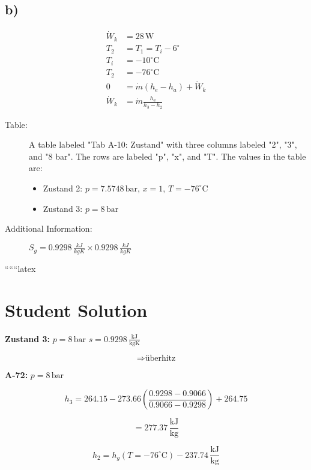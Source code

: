 

\subsection*{b)}

\begin{align*}
    \dot{W}_k &= 28 \, \text{W} \\
    T_2 &= T_1 = T_i - 6^\circ \\
    T_i &= -10^\circ \text{C} \\
    T_2 &= \boxed{-76^\circ \text{C}} \\
    0 &= \dot{m} (h_e - h_a) + \dot{W}_k \\
    \dot{W}_k &= \dot{m} \frac{h_a}{h_3 - h_2}
\end{align*}

\begin{description}
    \item[Table:] A table labeled "Tab A-10: Zustand" with three columns labeled "2", "3", and "8 bar". The rows are labeled "p", "x", and "T". The values in the table are:
    \begin{itemize}
        \item Zustand 2: $p = 7.5748 \, \text{bar}$, $x = 1$, $T = -76^\circ \text{C}$
        \item Zustand 3: $p = 8 \, \text{bar}$
    \end{itemize}
    \item[Additional Information:] $S_g = 0.9298 \, \frac{kJ}{kgK} \times 0.9298 \, \frac{kJ}{kgK}$
\end{description}

``````latex


\section*{Student Solution}

\textbf{Zustand 3:} $p = 8 \, \text{bar}$ \quad $s = 0.9298 \, \frac{\text{kJ}}{\text{kgK}}$

\[
\Rightarrow \text{überhitz}
\]

\textbf{A-72:} \quad $p = 8 \, \text{bar}$

\[
h_3 = 264.15 - 273.66 \left( \frac{0.9298 - 0.9066}{0.9066 - 0.9298} \right) + 264.75
\]

\[
= \boxed{277.37 \, \frac{\text{kJ}}{\text{kg}}}
\]

\[
h_2 = h_g (T = -76^\circ \text{C}) - 237.74 \, \frac{\text{kJ}}{\text{kg}}
\]

